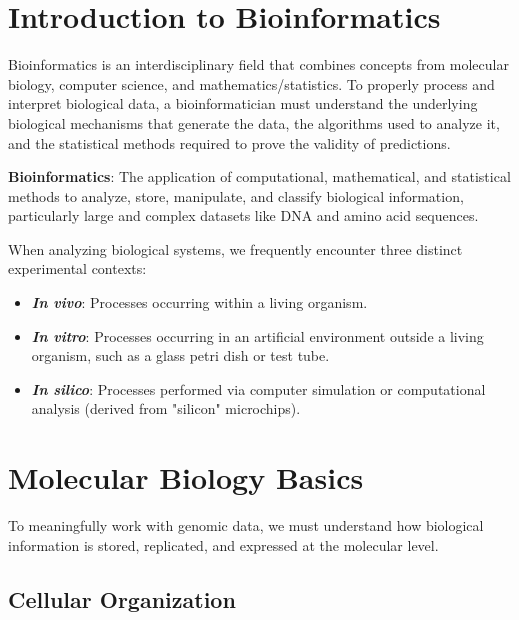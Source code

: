 \documentclass[11pt, a4paper]{article}
\begin{document}

\section{Introduction to Bioinformatics}

Bioinformatics is an interdisciplinary field that combines concepts from molecular biology, computer science, and mathematics/statistics. To properly process and interpret biological data, a bioinformatician must understand the underlying biological mechanisms that generate the data, the algorithms used to analyze it, and the statistical methods required to prove the validity of predictions.

\begin{important}
    \textbf{Bioinformatics}: The application of computational, mathematical, and statistical methods to analyze, store, manipulate, and classify biological information, particularly large and complex datasets like DNA and amino acid sequences.
\end{important}

When analyzing biological systems, we frequently encounter three distinct experimental contexts:
\begin{itemize}
    \item \textbf{\textit{In vivo}}: Processes occurring within a living organism.
    \item \textbf{\textit{In vitro}}: Processes occurring in an artificial environment outside a living organism, such as a glass petri dish or test tube.
    \item \textbf{\textit{In silico}}: Processes performed via computer simulation or computational analysis (derived from "silicon" microchips).
\end{itemize}

\section{Molecular Biology Basics}

To meaningfully work with genomic data, we must understand how biological information is stored, replicated, and expressed at the molecular level.

\subsection{Cellular Organization}
\end{document}
